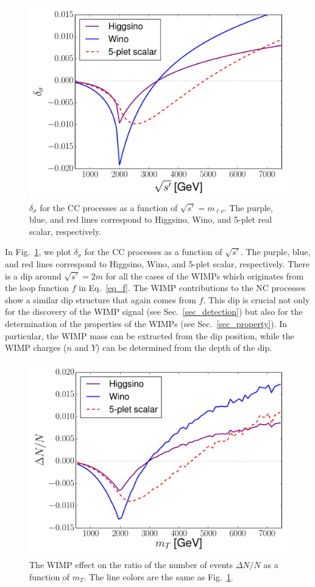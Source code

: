 \documentclass[12pt,twoside,book]{article}
\begin{document}
\begin{figure}[t]
  \centering
  \includegraphics[width=0.5\hsize]{sqsp_vs_del.pdf}
  \caption{
    $\delta_\sigma$ for the CC processes as a function of $\sqrt{s'} = m_{\ell\nu}$.
    The purple, blue, and red lines correspond to Higgsino, Wino, and 5-plet real scalar, respectively.
  }
  \label{fig_sqsp_vs_del}
\end{figure}

In Fig.~\ref{fig_sqsp_vs_del}, we plot $\delta_\sigma$ for the CC processes as a function of $\sqrt{s'}$.
The purple, blue, and red lines correspond to Higgsino, Wino, and 5-plet scalar, respectively.
There is a dip around $\sqrt{s'} = 2m$ for all the cases of the WIMPs which originates from the loop function $f$ in Eq.~\eqref{eq_f}.
The WIMP contributions to the NC processes show a similar dip structure that again comes from $f$.
This dip is crucial not only for the discovery of the WIMP signal (see Sec.~\ref{sec_detection}) but also for the determination of the properties of the WIMPs (see Sec.~\ref{sec_property}).
In particular, the WIMP mass can be extracted from the dip position, while the WIMP charges ($n$ and $Y$) can be determined from the depth of the dip.

\begin{figure}[t]
  \centering
  \includegraphics[width=0.5\hsize]{mT_vs_del.pdf}
  \caption{
    The WIMP effect on the ratio of the number of events $\Delta N / N$ as a function of $m_T$.
    The line colors are the same as Fig.~\ref{fig_sqsp_vs_del}.
  }
  \label{fig_mT_vs_dN}
\end{figure}
\end{document}
